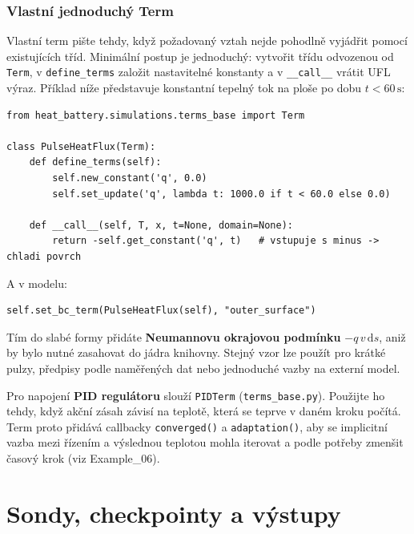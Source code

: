 \documentclass[a4paper,11pt]{article}
\begin{document}
\subsubsection*{Vlastní jednoduchý Term}

Vlastní term pište tehdy, když požadovaný vztah nejde pohodlně vyjádřit pomocí
existujících tříd. Minimální postup je jednoduchý: vytvořit třídu odvozenou od
\texttt{Term}, v \texttt{define\_terms} založit nastavitelné konstanty a v
\texttt{\_\_call\_\_} vrátit UFL výraz. Příklad níže představuje konstantní
tepelný tok na ploše po dobu \(t < 60\,\text{s}\):

\begin{lstlisting}[style=py]
from heat_battery.simulations.terms_base import Term

class PulseHeatFlux(Term):
    def define_terms(self):
        self.new_constant('q', 0.0)
        self.set_update('q', lambda t: 1000.0 if t < 60.0 else 0.0)

    def __call__(self, T, x, t=None, domain=None):
        return -self.get_constant('q', t)   # vstupuje s minus -> chladi povrch
\end{lstlisting}

A v modelu:

\begin{lstlisting}[style=py]
self.set_bc_term(PulseHeatFlux(self), "outer_surface")
\end{lstlisting}

Tím do slabé formy přidáte \textbf{Neumannovu okrajovou podmínku}
\(-q\,v\,\mathrm{d}s\), aniž by bylo nutné zasahovat do jádra knihovny. Stejný
vzor lze použít pro krátké pulzy, předpisy podle naměřených dat nebo jednoduché
vazby na externí model.

\begin{noteblock}
Pro napojení \textbf{PID regulátoru} slouží \texttt{PIDTerm}
(\texttt{terms\_base.py}). Použijte ho tehdy, když akční zásah závisí na teplotě,
která se teprve v daném kroku počítá. Term proto přidává callbacky
\texttt{converged()} a \texttt{adaptation()}, aby se implicitní vazba mezi
řízením a výslednou teplotou mohla iterovat a podle potřeby zmenšit časový krok
(viz Example\_06).
\end{noteblock}

\section{Sondy, checkpointy a výstupy}\label{sec:probes}
\end{document}
